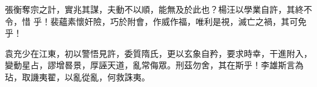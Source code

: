 \begin{pinyinscope}
 張衡奪宗之計，實兆其謀，夫動不以順，能無及於此也？楊汪以學業自許，其終不令，惜
 乎！裴蘊素懷奸險，巧於附會，作威作福，唯利是視，滅亡之禍，其可免乎！



 袁充少在江東，初以警悟見許，委質隋氏，更以玄象自矜，要求時幸，干進附入，變動星占，謬增晷景，厚誣天道，亂常侮眾。刑茲勿舍，其在斯乎！李雄斯言為玷，取譏夷翟，以亂從亂，何救誅夷。



\end{pinyinscope}